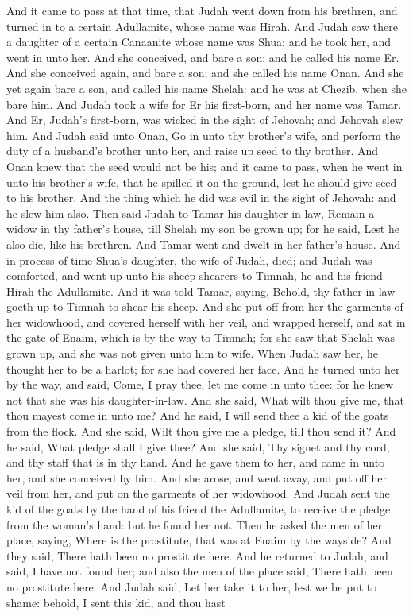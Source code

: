 And it came to pass at that time, that Judah went down from his brethren, and turned in to a certain Adullamite, whose name was Hirah. And Judah saw there a daughter of a certain Canaanite whose name was Shua; and he took her, and went in unto her. And she conceived, and bare a son; and he called his name Er. And she conceived again, and bare a son; and she called his name Onan. And she yet again bare a son, and called his name Shelah: and he was at Chezib, when she bare him. And Judah took a wife for Er his first-born, and her name was Tamar. And Er, Judah’s first-born, was wicked in the sight of Jehovah; and Jehovah slew him. And Judah said unto Onan, Go in unto thy brother’s wife, and perform the duty of a husband’s brother unto her, and raise up seed to thy brother. And Onan knew that the seed would not be his; and it came to pass, when he went in unto his brother’s wife, that he spilled it on the ground, lest he should give seed to his brother. And the thing which he did was evil in the sight of Jehovah: and he slew him also. Then said Judah to Tamar his daughter-in-law, Remain a widow in thy father’s house, till Shelah my son be grown up; for he said, Lest he also die, like his brethren. And Tamar went and dwelt in her father’s house.  And in process of time Shua’s daughter, the wife of Judah, died; and Judah was comforted, and went up unto his sheep-shearers to Timnah, he and his friend Hirah the Adullamite. And it was told Tamar, saying, Behold, thy father-in-law goeth up to Timnah to shear his sheep. And she put off from her the garments of her widowhood, and covered herself with her veil, and wrapped herself, and sat in the gate of Enaim, which is by the way to Timnah; for she saw that Shelah was grown up, and she was not given unto him to wife. When Judah saw her, he thought her to be a harlot; for she had covered her face. And he turned unto her by the way, and said, Come, I pray thee, let me come in unto thee: for he knew not that she was his daughter-in-law. And she said, What wilt thou give me, that thou mayest come in unto me? And he said, I will send thee a kid of the goats from the flock. And she said, Wilt thou give me a pledge, till thou send it? And he said, What pledge shall I give thee? And she said, Thy signet and thy cord, and thy staff that is in thy hand. And he gave them to her, and came in unto her, and she conceived by him. And she arose, and went away, and put off her veil from her, and put on the garments of her widowhood. And Judah sent the kid of the goats by the hand of his friend the Adullamite, to receive the pledge from the woman’s hand: but he found her not. Then he asked the men of her place, saying, Where is the prostitute, that was at Enaim by the wayside? And they said, There hath been no prostitute here. And he returned to Judah, and said, I have not found her; and also the men of the place said, There hath been no prostitute here. And Judah said, Let her take it to her, lest we be put to shame: behold, I sent this kid, and thou hast 